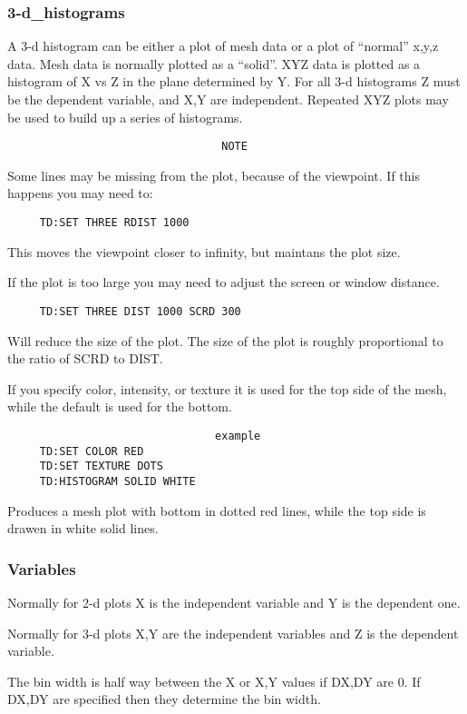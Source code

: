 \subsubsection{3-d\_histograms}
A 3-d histogram can be either a plot of mesh data or a plot of ``normal''
x,y,z data.  Mesh data is normally plotted as a ``solid''.  XYZ  data  is
plotted as a histogram of X vs Z in the plane determined by Y.  For all
3-d  histograms  Z  must  be  the  dependent  variable,  and  X,Y   are
independent.   Repeated  XYZ  plots may be used to build up a series of
histograms.  

\begin{verbatim}
                                 NOTE
\end{verbatim}
Some  lines may be missing from the plot, because of the viewpoint.  If
this happens you may need to:  
\begin{verbatim}
     TD:SET THREE RDIST 1000 
\end{verbatim}
This  moves  the  viewpoint  closer  to infinity, but maintans the plot
size.  

If  the  plot  is too large you may need to adjust the screen or window
distance.  
\begin{verbatim}
     TD:SET THREE DIST 1000 SCRD 300 
\end{verbatim}
Will  reduce  the  size  of  the plot.  The size of the plot is roughly
proportional to the ratio of SCRD to DIST.  

If you specify color, intensity, or texture it is used for the top side
of the mesh, while the default is used for the bottom.  

\begin{verbatim}
                                example
     TD:SET COLOR RED 
     TD:SET TEXTURE DOTS 
     TD:HISTOGRAM SOLID WHITE 
\end{verbatim}
Produces  a  mesh  plot  with bottom in dotted red lines, while the top
side is drawen in white solid lines.  
\subsubsection{Variables}
Normally  for  2-d  plots  X  is  the independent variable and Y is the
dependent one.  

Normally  for  3-d plots X,Y are the independent variables and Z is the
dependent variable.  

The  bin  width is half way between the X or X,Y values if DX,DY are 0.
If DX,DY are specified then they determine the bin width.  
